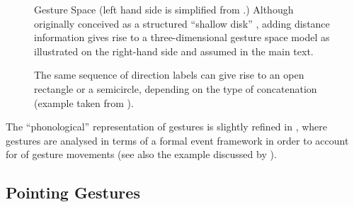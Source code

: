 \documentclass[output=paper]{langsci/langscibook}
\begin{document}
\begin{figure}[tb]
  \caption[Gesture Space]{Gesture Space (left hand side is simplified from \citet[]{McNeill:1992}.) Although originally conceived as a structured \enquote{shallow disk} \citet[]{McNeill:1992}, adding distance information gives rise to a three-dimensional gesture space model as illustrated on the right-hand side and assumed in the main text.}
  \label{fig:gesture-space}
\end{figure}


\begin{figure}[tb]
  \centering
  \caption{The same sequence of direction labels can give rise to an open rectangle or a semicircle, depending on the type of concatenation (example taken from \citet{Luecking:2016}).}
  \label{fig:move-direction}
\end{figure}


The \enquote{phonological} representation of gestures is slightly refined in \citet{Luecking:2016}, where gestures are analysed in terms of a formal event framework  \citep{Fernando:2011,Cooper:Ginzburg:2015} in order to account for  of gesture movements (see also the example discussed by \citet{Rieser:2008}).




\subsection{Pointing Gestures}
\label{sec:pointing-gestures}
\end{document}
